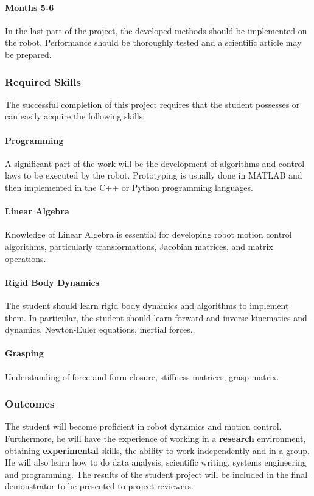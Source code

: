 \paragraph{Months 5-6}
In the last part of the project, the developed methods should be implemented on the robot. Performance should be thoroughly tested and a scientific article may be prepared.
\subsubsection{Required Skills}
The successful completion of this project requires that the student possesses or can easily acquire the following skills: 
\paragraph{Programming} A significant part of the work will be the development of algorithms and control laws to be executed by the robot. Prototyping is usually done in MATLAB and then implemented in the C++ or Python programming languages.
\paragraph{Linear Algebra} Knowledge of Linear Algebra is essential for developing robot motion control algorithms, particularly  transformations, Jacobian matrices, and matrix operations.
\paragraph{Rigid Body Dynamics} 
The student should learn rigid body dynamics and algorithms to implement them.
In particular, the student should learn forward and inverse kinematics and dynamics, Newton-Euler equations, inertial forces.
\paragraph{Grasping} 
Understanding of force and form closure, stiffness matrices, grasp matrix.

\subsubsection{Outcomes}
The student will become proficient in robot dynamics and motion control. 
Furthermore, he will have the experience of working in a \textbf{research} environment, obtaining \textbf{experimental} skills, the ability to work independently and in a group. He will also learn how to do data analysis, scientific writing, systems engineering and programming.
The results of the student project will be included in the final demonstrator to be presented to project reviewers.